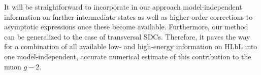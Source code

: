 It will be straightforward to incorporate in our approach model-independent information on further intermediate states as well as higher-order corrections to asymptotic expressions once these become available. Furthermore, our method can be generalized to the case of transversal SDCs. Therefore, it paves the way for a combination of all available low- and high-energy information on HLbL into one model-independent, accurate numerical estimate of this contribution to the muon $g-2$.